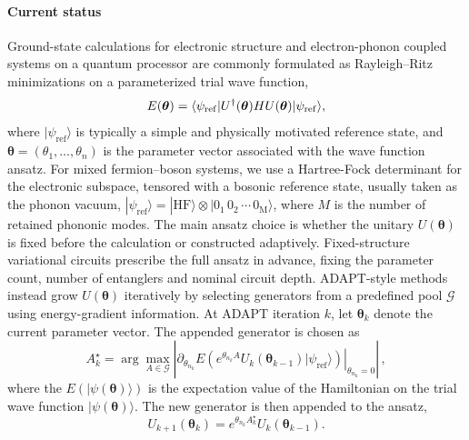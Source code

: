 \documentclass[
  reprint,
  amsmath,
  amssymb,
  aps,
  pra,
  nofootinbib,
  superscriptaddress,
  floatfix
]{revtex4-2}
\newcommand{\ket}[1]{|#1\rangle}
\newcommand{\bra}[1]{\langle #1|}
\begin{document}
\paragraph*{Current status}
Ground-state calculations for electronic structure and electron-phonon coupled systems on a quantum processor are commonly formulated as Rayleigh--Ritz minimizations on a parameterized trial wave function\cite{Peruzzo2014,McClean2016,Kandala2017},
\begin{equation}
E(\boldsymbol{\theta})=
\bra{\psi_{\rm ref}}U^\dagger(\boldsymbol{\theta})HU(\boldsymbol{\theta})\ket{\psi_{\rm ref}},
\label{eq:rayleigh_static}
\end{equation}
where \(\ket{\psi_{\mathrm{ref}}}\) is typically a simple and physically motivated reference state, and $\boldsymbol{\theta}=(\theta_1,\ldots,\theta_n)$ is the parameter vector associated with the wave function ansatz. For mixed fermion--boson systems, we use a Hartree-Fock determinant for the electronic subspace, tensored with a bosonic reference state, usually taken as the phonon vacuum, \(\ket{\psi_{\mathrm{ref}}}=\ket{\mathrm{HF}}\otimes\ket{0_1\,0_2\,\cdots\,0_{\mathrm{M}}}\), where \(M\) is the number of retained phononic modes. The main ansatz choice is whether the unitary \(U(\boldsymbol{\theta})\) is fixed before the calculation or constructed adaptively. Fixed-structure variational circuits prescribe the full ansatz in advance, fixing the parameter count, number of entanglers and nominal circuit depth. ADAPT-style methods instead grow \(U(\boldsymbol{\theta})\) iteratively by selecting generators from a predefined pool \(\mathcal{G}\) using energy-gradient information\cite{Grimsley2019,Tang2021,Yordanov2021}. At ADAPT iteration \(k\), let \(\boldsymbol{\theta}_k\) denote the current parameter vector. The appended generator is chosen as
\begin{equation}
A_k^\star=\arg\max_{A\in\mathcal G}
\left|
\left.
\partial_{\theta_{n_k}}E\!\left(e^{\theta_{n_k} A}U_k(\boldsymbol{\theta}_{k-1})\ket{\psi_{\mathrm{ref}}}\right)
\right|_{\theta_{n_k}=0}
\right|\,,
\end{equation}
where the $E(\ket{\psi(\boldsymbol{\theta})})$ is the expectation value of the Hamiltonian on the trial wave function $\ket{\psi(\boldsymbol{\theta})}$. The new generator is then appended to the ansatz,
\begin{equation}
U_{k+1}(\boldsymbol{\theta}_{k})=e^{\theta_{n_k} A_k^\star}U_k(\boldsymbol{\theta}_{k-1}).
\end{equation}
\end{document}

